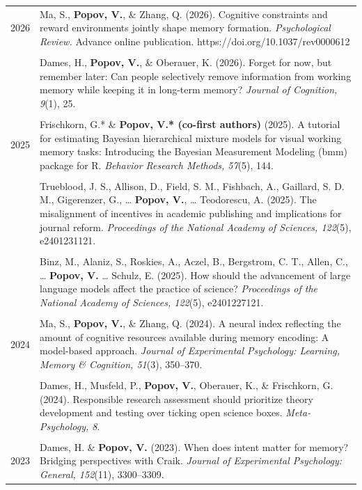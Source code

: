 \documentclass[letterpaper]{article}
\begin{document}
\begin{longtable}{p{0.7cm}p{15cm}}
2026 & Ma, S., \textbf{Popov, V.}, \& Zhang, Q. (2026). Cognitive constraints and reward environments jointly shape memory formation. {\it Psychological Review.} Advance online publication. https://doi.org/10.1037/rev0000612\\[6pt]
&\\
& Dames, H., \textbf{Popov, V.}, \& Oberauer, K. (2026). Forget for now, but remember later: Can people selectively remove information from working memory while keeping it in long-term memory? {\it Journal of Cognition, 9}(1), 25.\\[6pt]
&\\
2025 & Frischkorn, G.* \& \textbf{Popov, V.* (co-first authors)} (2025). A tutorial for estimating Bayesian hierarchical mixture models for visual working memory tasks: Introducing the Bayesian Measurement Modeling (bmm) package for R. {\it Behavior Research Methods, 57}(5), 144.\\[6pt]
&\\
& Trueblood, J. S., Allison, D., Field, S. M., Fishbach, A., Gaillard, S. D. M., Gigerenzer, G., … \textbf{Popov, V.}, … Teodorescu, A. (2025). The misalignment of incentives in academic publishing and implications for journal reform. {\it Proceedings of the National Academy of Sciences, 122}(5), e2401231121.\\[6pt]
&\\
& Binz, M., Alaniz, S., Roskies, A., Aczel, B., Bergstrom, C. T., Allen, C., … \textbf{Popov, V.} … Schulz, E. (2025). How should the advancement of large language models affect the practice of science? {\it Proceedings of the National Academy of Sciences, 122}(5), e2401227121.\\[6pt]
&\\
2024 & Ma, S., \textbf{Popov, V.}, \& Zhang, Q. (2024). A neural index reflecting the amount of cognitive resources available during memory encoding: A model-based approach. {\it Journal of Experimental Psychology: Learning, Memory \& Cognition, 51}(3), 350--370.\\[6pt]
&\\
& Dames, H., Musfeld, P., \textbf{Popov, V.}, Oberauer, K., \& Frischkorn, G. (2024). Responsible research assessment should prioritize theory development and testing over ticking open science boxes. {\it Meta-Psychology, 8}.\\[6pt]
&\\
2023 & Dames, H. \& \textbf{Popov, V.} (2023). When does intent matter for memory? Bridging perspectives with Craik. {\it Journal of Experimental Psychology: General, 152}(11), 3300--3309.\\[6pt]

\end{longtable}
\end{document}
